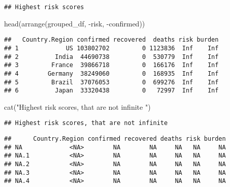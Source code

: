 \documentclass[
]{article}
\newenvironment{Shaded}{\begin{snugshade}}{\end{snugshade}}
\newcommand{\ConstantTok}[1]{\textcolor[rgb]{0.00,0.00,0.00}{#1}}
\newcommand{\FunctionTok}[1]{\textcolor[rgb]{0.00,0.00,0.00}{#1}}
\newcommand{\NormalTok}[1]{#1}
\newcommand{\SpecialCharTok}[1]{\textcolor[rgb]{0.00,0.00,0.00}{#1}}
\newcommand{\StringTok}[1]{\textcolor[rgb]{0.31,0.60,0.02}{#1}}
\begin{document}
\begin{verbatim}
## Highest risk scores
\end{verbatim}

\begin{Shaded}
\begin{Highlighting}[]
\FunctionTok{head}\NormalTok{(}\FunctionTok{arrange}\NormalTok{(grouped\_df, }\SpecialCharTok{{-}}\NormalTok{risk, }\SpecialCharTok{{-}}\NormalTok{confirmed))}
\end{Highlighting}
\end{Shaded}

\begin{verbatim}
##   Country.Region confirmed recovered  deaths risk burden
## 1             US 103802702         0 1123836  Inf    Inf
## 2          India  44690738         0  530779  Inf    Inf
## 3         France  39866718         0  166176  Inf    Inf
## 4        Germany  38249060         0  168935  Inf    Inf
## 5         Brazil  37076053         0  699276  Inf    Inf
## 6          Japan  33320438         0   72997  Inf    Inf
\end{verbatim}

\begin{Shaded}
\begin{Highlighting}[]
\FunctionTok{cat}\NormalTok{(}\StringTok{"Highest risk scores, that are not infinite "}\NormalTok{)}
\end{Highlighting}
\end{Shaded}

\begin{verbatim}
## Highest risk scores, that are not infinite
\end{verbatim}

\begin{Shaded}
\end{Shaded}

\begin{verbatim}
##      Country.Region confirmed recovered deaths risk burden
## NA             <NA>        NA        NA     NA   NA     NA
## NA.1           <NA>        NA        NA     NA   NA     NA
## NA.2           <NA>        NA        NA     NA   NA     NA
## NA.3           <NA>        NA        NA     NA   NA     NA
## NA.4           <NA>        NA        NA     NA   NA     NA
\end{verbatim}
\end{document}
